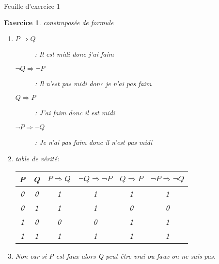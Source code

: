 \documentclass{article}
\theoremstyle{plain}
\newtheorem{exo}{Exercice}%
\begin{document}
\begin{center}
\large\sc Feuille d'exercice 1
\end{center}

\begin{exo} constraposée de formule
\begin{enumerate}
    \item \begin{description}
        \item[$P \Rightarrow Q$]:  Il est midi donc j'ai faim
        \item[$\neg Q \Rightarrow \neg P$]:  Il n'est pas midi donc je n'ai pas faim
        \item[$Q \Rightarrow P$]:  J'ai faim donc il est midi
        \item[$\neg P \Rightarrow \neg Q$]: Je n'ai pas faim donc il n'est pas midi
    \end{description}

    \item table de vérité: \vspace{3mm} \\
    \begin{tabular} {c|c|c|c|c|c}
        P & Q & $P \Rightarrow Q$ & $\neg Q \Rightarrow \neg P$ & $Q \Rightarrow P$ & $\neg P \Rightarrow \neg Q$ \\
        \hline
        0 & 0 & 1 & 1 & 1 & 1 \\
        0 & 1 & 1 & 1 & 0 & 0 \\
        1 & 0 & 0 & 0 & 1 & 1 \\
        1 & 1 & 1 & 1 & 1 & 1 \\
    \end{tabular}

    \item Non car si P est faux alors Q peut être vrai ou faux on ne sais pas.
\end{enumerate}
\end{exo}
\end{document}
